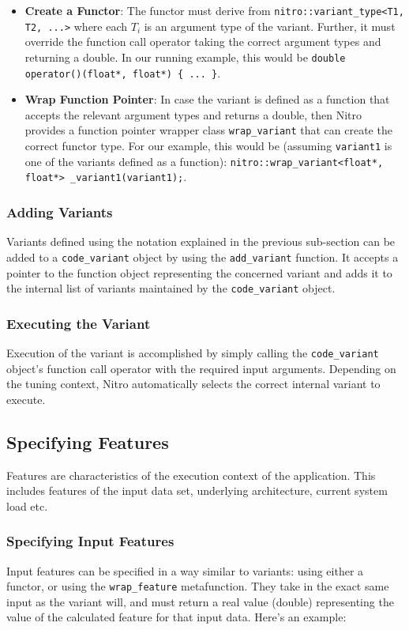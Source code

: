 \documentclass[12pt]{article}
\begin{document}
\begin{itemize}
\item \textbf{Create a Functor}: The functor must derive from \texttt{nitro::variant\_type<T1, T2, ...>}
where each $T_i$ is an argument type of the variant. Further, it must override the function call
operator taking the correct argument types and returning a double. In our running example, this would
be \texttt{double operator()(float*, float*) \{ ... \}}.

\item \textbf{Wrap Function Pointer}: In case the variant is defined as a function that
accepts the relevant argument types and returns a double, then Nitro provides a function pointer wrapper
class \texttt{wrap\_variant} that can create the correct functor type. For our example, this would
be (assuming \texttt{variant1} is one of the variants defined as a function):
\texttt{nitro::wrap\_variant<float*, float*> \_variant1(variant1);}.
\end{itemize}

\subsubsection{Adding Variants}
Variants defined using the notation explained in the previous sub-section can be added to
a \texttt{code\_variant} object by using the \texttt{add\_variant} function. It accepts
a pointer to the function object representing the concerned variant and adds it to the internal
list of variants maintained by the \texttt{code\_variant} object.

\subsubsection{Executing the Variant}
Execution of the variant is accomplished by simply calling the \texttt{code\_variant} object's
function call operator with the required input arguments. Depending on the tuning context, Nitro
automatically selects the correct internal variant to execute.

\subsection{Specifying Features}

Features are characteristics of the execution context of the application. This includes
features of the input data set, underlying architecture, current system load etc.

\subsubsection{Specifying Input Features}
Input features can be specified in a way similar to variants: using either a functor, or
using the \texttt{wrap\_feature} metafunction. They take in the exact same input as the
variant will, and must return a real value (double) representing the value of the calculated
feature for that input data. Here's an example:
\end{document}
